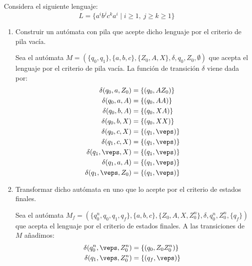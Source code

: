 \begin{ejercicio}\label{ej:1.5.8}
    Considera el siguiente lenguaje:
    \begin{equation*}
        L = \{a^i b^j c^k a^i \mid i\geq 1,\ j\geq k \geq 1\}
    \end{equation*}
    \begin{enumerate}
        \item Construir un autómata con pila que acepte dicho lenguaje por el criterio de pila vacía.
        
        Sea el autómata $M = (\{q_0,q_1\},\{a,b,c\},\{Z_0,A,X\},\delta,q_0,Z_0,\emptyset)$ que acepta el lenguaje por el criterio de pila vacía.
        La función de transición $\delta$ viene dada por:
        \begin{align*}
            \delta(q_0,a,Z_0) &= \{(q_0,AZ_0)\} \\
            \delta(q_0,a,A) &= \{(q_0,AA)\} \\
            \delta(q_0,b,A) &= \{(q_0,XA)\} \\
            \delta(q_0,b,X) &= \{(q_0,XX)\} \\
            \delta(q_0,c,X) &= \{(q_1,\veps)\} \\
            \delta(q_1,c,X) &= \{(q_1,\veps)\} \\
            \delta(q_1,\veps,X) &= \{(q_1,\veps)\} \\
            \delta(q_1,a,A) &= \{(q_1,\veps)\}\\
            \delta(q_1,\veps,Z_0) &= \{(q_1,\veps)\}
        \end{align*}
        \item Transformar dicho autómata en uno que lo acepte por el criterio de estados finales.
        
        Sea el autómata $M_f = (\{q_0^n, q_0,q_1, q_f\},\{a,b,c\},\{Z_0,A,X, Z_0^n\},\delta,q_0^n,Z_0^n,\{q_f\})$ que acepta el lenguaje por el criterio de estados finales. A las transiciones de $M$ añadimos:
        \begin{align*}
            \delta(q_0^n,\veps,Z_0^n) &= \{(q_0,Z_0Z_0^n)\} \\
            \delta(q_1,\veps,Z_0^n) &= \{(q_f,\veps)\}
        \end{align*}
    \end{enumerate}
\end{ejercicio}


